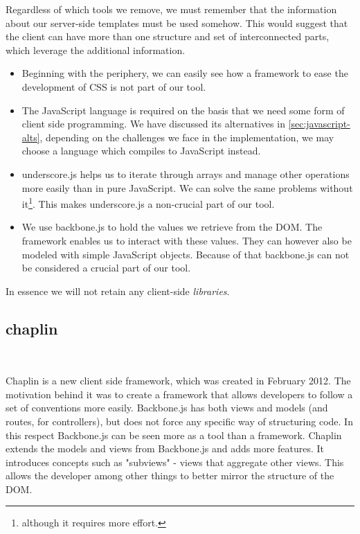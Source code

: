 \documentclass[thesis.tex]{subfiles}
\begin{document}
Regardless of which tools we remove, we must remember that the information about
our server-side templates must be used somehow. This would suggest that the
client can have more than one structure and set of interconnected parts, which
leverage the additional information.

\begin{itemize}
\item Beginning with the periphery, we can easily see how a framework to ease
the development of CSS is not part of our tool.
\item The JavaScript language is required on the basis that we need some form of
client side programming. We have discussed its alternatives in
\ref{sec:javascript-alts}, depending on the challenges we face in the
implementation, we may choose a language which compiles to JavaScript instead.
\item underscore.js helps us to iterate through arrays and manage other
operations more easily than in pure JavaScript. We can solve the same problems
without it\footnote{
	although it requires more effort.
}. This makes underscore.js a non-crucial part of our tool.
\item We use backbone.js to hold the values we retrieve from the DOM. The
framework enables us to interact with these values. They can however also be
modeled with simple JavaScript objects. Because of that backbone.js can not be
considered a crucial part of our tool.
\end{itemize}

In essence we will not retain any client-side \emph{libraries}.



\subsection{chaplin}

\

Chaplin is a new client side framework, which was created in February 2012.
The motivation behind it was to create a framework that allows developers to
follow a set of conventions more easily. Backbone.js has both views and models
(and routes, for controllers), but does not force any specific way of
structuring code. In this respect Backbone.js can be seen more as a tool than a
framework.
Chaplin extends the models and views from Backbone.js and adds more features.
It introduces concepts such as "subviews" - views that aggregate other views.
This allows the developer among other things to better mirror the structure of
the DOM.
\end{document}
